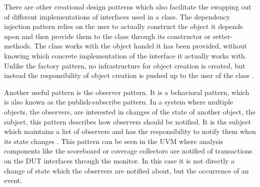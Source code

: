 There are other creational design patterns which also facilitate the swapping out of different implementations of
interfaces used in a class. The dependency injection pattern relies on the user to actually construct the object it
depends upon and then provide them to the class through its constructor or setter-methods. The class works with the
object handel it has been provided, without knowing which concrete implementation of the interface it actually works
with. Unlike the factory pattern, no infrastructure for object creation is created, but instead the responsibility of
object creation is pushed up to the user of the class \cite{ioc_di}.

Another useful pattern is the observer pattern. It is a behavioral pattern, which is also known as the
publish-subscribe pattern. In a system where multiple objects, the observers, are interested in changes of the state
of another object, the subject, this pattern describes how observers should be notified. It is the subject which
maintains a list of observers and has the responsibility to notify them when its state changes \cite[Ch.
5]{design_patterns}. This pattern can be seen in the UVM where analysis components like the scoreboard or coverage
collectors are notified of transactions on the DUT interfaces through the monitor. In this case it is not directly a
change of state which the observers are notified about, but the occurrence of an event.


